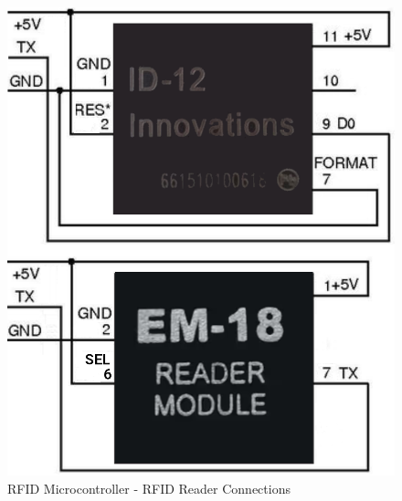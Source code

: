 \begin{figure}[H]
    \includegraphics[scale=0.2]{../Images/rfid-readers.png}
  \caption{RFID Microcontroller - RFID Reader Connections}
  \label{fig:rfid-board}
\end{figure}

